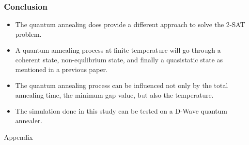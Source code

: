 \documentclass{beamer}
\begin{document}
\begin{frame}
	\frametitle{Conclusion}
	\begin{itemize}
		\item The quantum annealing does provide a different approach to solve the 2-SAT problem.
		\item A quantum annealing process at finite temperature will go through a coherent state, non-equlibrium state, and finally a quasistatic state as mentioned in a previous paper.
		\item The quantum annealing process can be influenced not only by the total annealing time, the minimum gap value, but also the temperature.
		\item The simulation done in this study can be tested on a D-Wave quantum annealer.%
	\end{itemize}
\end{frame}

\appendix

\mode*

\begin{frame}
	\centering
	Appendix
\end{frame}
\end{document}
